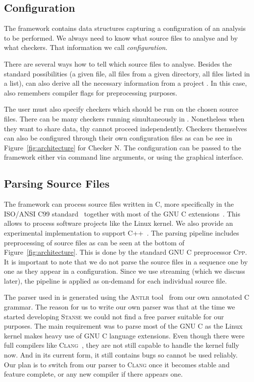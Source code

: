 \subsection*{Configuration}

The \stan framework contains data structures capturing a configuration of an
analysis to be performed. We always need to know what source files to analyse
and by what checkers. That information we call \emph{configuration}. 

There are several ways how to tell \stan which source files to analyse. Besides
the standard possibilities (a given file, all files from a given
directory, all files listed in a list), \stan can also derive all
the necessary information from a project . In this case,
\stan also remembers compiler flags for preprocessing purposes.

The user must also specify checkers which should be run on the chosen source
files.  There can be many checkers running simultaneously in \stan.
Nonetheless when they want to share data, thy cannot proceed independently.
Checkers themselves can also be configured through their own configuration
files as can be see in Figure~\ref{fig:architecture} for \textsf{Checker N}.
The configuration can be passed to the \stan framework either via command line
arguments, or using the graphical interface.

\subsection*{Parsing Source Files}

The \stan framework can process source files written in C, more
specifically in the ISO/ANSI C99 standard~\cite{ansi_c} together with most of
the GNU C extensions~\cite{gcc}. This allows \stan to process software
projects like the Linux kernel. We also provide an experimental implementation
to support C++~\cite{ansi_cpp}.  The parsing pipeline includes preprocessing
of source files as can be seen at the bottom of Figure~\ref{fig:architecture}.
This is done by the standard GNU C preprocessor \textsc{Cpp}.  It is important
to note that we do not parse the source files in a sequence one by one as they
appear in a configuration. Since we use streaming (which we discuss later),
the pipeline is applied as on-demand for each individual source file.

The parser used in \stan is generated using the \textsc{Antlr}
tool~\cite{antlr4} from our own annotated C grammar. The reason for us to
write our own parser was that at the time we started developing
\textsc{Stanse} we could not find a free parser suitable for our purposes.
The main requirement was to parse most of the GNU C as the Linux kernel makes
heavy use of GNU C language extensions. Even though there were full compilers
like \textsc{Clang}~\cite{clang}, they are not still capable to handle the
kernel fully now. And in its current form, it still contains bugs so cannot
be used reliably. Our plan is to switch from our parser to \textsc{Clang} once
it becomes stable and feature complete, or any new compiler if there appears
one.

